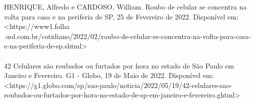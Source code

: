 

\noindent
HENRIQUE, Alfredo e CARDOSO, William. Roubo de celular se concentra na volta para casa e na periferia de SP, 25 de Fevereiro de 2022. 
Disponível em: <https://www1.folha\\.uol.com.br/cotidiano/2022/02/roubo-de-celular-se-concentra-na-volta-para-casa-e-na-periferia-de-sp.shtml> 
\\ \\
42 Celulares são roubados ou furtados por hora no estado de São Paulo em Janeiro e Fevereiro. G1 - Globo, 19 de Maio de 2022.
Disponível em: <https://g1.globo.com/sp/sao-paulo/noticia/2022/05/19/42-celulares-sao-roubados-ou-furtados-por-hora-no-estado-de-sp-em-janeiro-e-fevereiro.ghtml>